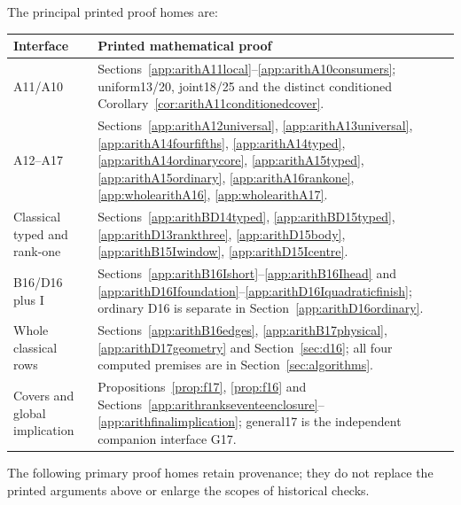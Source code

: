 \documentclass[11pt]{article}
\newcommand{\supp}[1]{\textsf{#1}}
\begin{document}
The principal printed proof homes are:
\begin{center}\small
\begin{tabular}{lp{10.4cm}}
\toprule Interface&Printed mathematical proof\\\midrule
A11/A10&Sections~\ref{app:arithA11local}--\ref{app:arithA10consumers}; uniform13/20, joint18/25 and the distinct conditioned Corollary~\ref{cor:arithA11conditionedcover}.\\
A12--A17&Sections~\ref{app:arithA12universal}, \ref{app:arithA13universal}, \ref{app:arithA14fourfifths}, \ref{app:arithA14typed}, \ref{app:arithA14ordinarycore}, \ref{app:arithA15typed}, \ref{app:arithA15ordinary}, \ref{app:arithA16rankone}, \ref{app:wholearithA16}, \ref{app:wholearithA17}.\\
Classical typed and rank-one&Sections~\ref{app:arithBD14typed}, \ref{app:arithBD15typed}, \ref{app:arithD13rankthree}, \ref{app:arithD15body}, \ref{app:arithB15Iwindow}, \ref{app:arithD15Icentre}.\\
B16/D16 plus I&Sections~\ref{app:arithB16Ishort}--\ref{app:arithB16Ihead} and \ref{app:arithD16Ifoundation}--\ref{app:arithD16Iquadraticfinish}; ordinary D16 is separate in Section~\ref{app:arithD16ordinary}.\\
Whole classical rows&Sections~\ref{app:arithB16edges}, \ref{app:arithB17physical}, \ref{app:arithD17geometry} and Section~\ref{sec:d16}; all four computed premises are in Section~\ref{sec:algorithms}.\\
Covers and global implication&Propositions~\ref{prop:f17}, \ref{prop:f16} and Sections~\ref{app:arithrankseventeenclosure}--\ref{app:arithfinalimplication}; general17 is the independent companion interface \supp{G17}.\\
\bottomrule
\end{tabular}
\end{center}
The following primary proof homes retain provenance; they do not replace
the printed arguments above or enlarge the scopes of historical checks.
\end{document}
